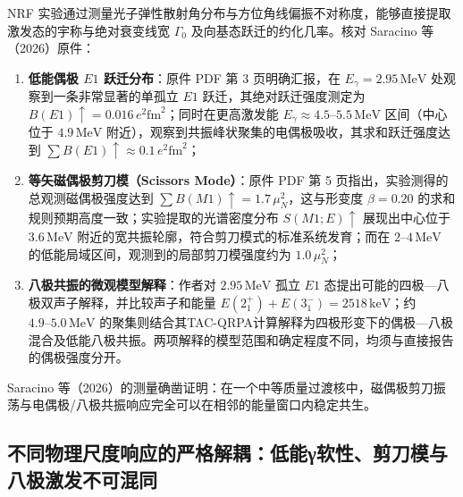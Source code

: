 NRF 实验通过测量光子弹性散射角分布与方位角线偏振不对称度，能够直接提取激发态的宇称与绝对衰变线宽 $\Gamma_0$ 及向基态跃迁的约化几率。核对 Saracino 等（2026）原件：
\begin{enumerate}
\item \textbf{低能偶极 $E1$ 跃迁分布}：原件 PDF 第 3 页明确汇报，在 $E_\gamma = 2.95\,\mathrm{MeV}$ 处观察到一条非常显著的单孤立 $E1$ 跃迁，其绝对跃迁强度测定为 $B(E1)\uparrow = 0.016\,e^2\mathrm{fm}^2$；同时在更高激发能 $E_\gamma \approx 4.5\text{--}5.5\,\mathrm{MeV}$ 区间（中心位于 $4.9\,\mathrm{MeV}$ 附近），观察到共振峰状聚集的电偶极吸收，其求和跃迁强度达到 $\sum B(E1)\uparrow \approx 0.1\,e^2\mathrm{fm}^2$；
\item \textbf{等矢磁偶极剪刀模（Scissors Mode）}：原件 PDF 第 5 页指出，实验测得的总观测磁偶极强度达到 $\sum B(M1)\uparrow = 1.7\,\mu_N^2$，这与形变度 $\beta = 0.20$ 的求和规则预期高度一致；实验提取的光谱密度分布 $S(M1; E)\uparrow$ 展现出中心位于 $3.6\,\mathrm{MeV}$ 附近的宽共振轮廓，符合剪刀模式的标准系统发育；而在 $2\text{--}4\,\mathrm{MeV}$ 的低能局域区间，观测到的局部剪刀模强度约为 $1.0\,\mu_N^2$；
\item \textbf{八极共振的微观模型解释}：作者对 $2.95\,\mathrm{MeV}$ 孤立 $E1$ 态提出可能的四极—八极双声子解释，并比较声子和能量 $E(2_1^+)+E(3_1^-)=2518\,\mathrm{keV}$；约 $4.9\text{--}5.0\,\mathrm{MeV}$ 的聚集则结合其TAC-QRPA计算解释为四极形变下的偶极—八极混合及低能八极共振。两项解释的模型范围和确定程度不同，均须与直接报告的偶极强度分开。
\end{enumerate}
Saracino 等（2026）的测量确凿证明：在一个中等质量过渡核中，磁偶极剪刀振荡与电偶极/八极共振响应完全可以在相邻的能量窗口内稳定共生。

\subsection{不同物理尺度响应的严格解耦：低能γ软性、剪刀模与八极激发不可混同}\label{sec:4-3-5}


